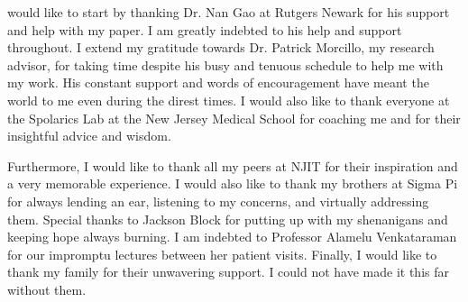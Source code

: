 would like to start by thanking Dr. Nan Gao at Rutgers Newark for his
support and help with my paper. I am greatly indebted to his help and
support throughout. I extend my gratitude towards Dr. Patrick Morcillo,
my research advisor, for taking time despite his busy and tenuous
schedule to help me with my work. His constant support and words of
encouragement have meant the world to me even during the direst times. I
would also like to thank everyone at the Spolarics Lab at the New Jersey
Medical School for coaching me and for their insightful advice and
wisdom.

Furthermore, I would like to thank all my peers at NJIT for their
inspiration and a very memorable experience. I would also like to thank
my brothers at Sigma Pi for always lending an ear, listening to my
concerns, and virtually addressing them. Special thanks to Jackson Block
for putting up with my shenanigans and keeping hope always burning. I am
indebted to Professor Alamelu Venkataraman for our impromptu lectures
between her patient visits. Finally, I would like to thank my family for
their unwavering support. I could not have made it this far without
them.
